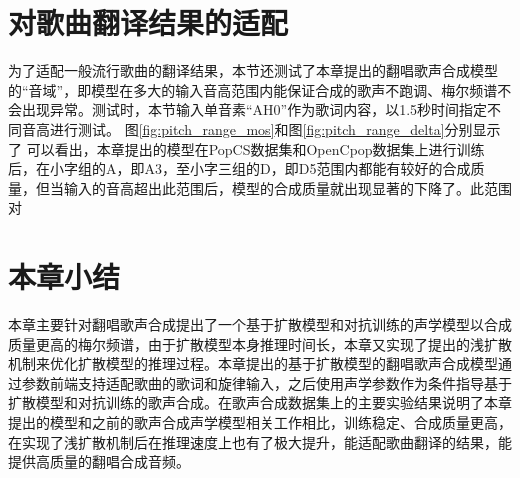 \section{对歌曲翻译结果的适配}
为了适配一般流行歌曲的翻译结果，本节还测试了本章提出的翻唱歌声合成模型的``音域''，即模型在多大的输入音高范围内能保证合成的歌声不跑调、梅尔频谱不会出现异常。测试时，本节输入单音素``AH0''作为歌词内容，以1.5秒时间指定不同音高进行测试。
图\ref{fig:pitch_range_mos}和图\ref{fig:pitch_range_delta}分别显示了
可以看出，本章提出的模型在PopCS数据集和OpenCpop数据集上进行训练后，在小字组的A，即A3，至小字三组的D，即D5范围内都能有较好的合成质量，但当输入的音高超出此范围后，模型的合成质量就出现显著的下降了。此范围对
\section{本章小结}
本章主要针对翻唱歌声合成提出了一个基于扩散模型和对抗训练的声学模型以合成质量更高的梅尔频谱，由于扩散模型本身推理时间长，本章又实现了\citet{diffsinger}提出的浅扩散机制来优化扩散模型的推理过程。本章提出的基于扩散模型的翻唱歌声合成模型通过参数前端支持适配歌曲的歌词和旋律输入，之后使用声学参数作为条件指导基于扩散模型和对抗训练的歌声合成。在歌声合成数据集上的主要实验结果说明了本章提出的模型和之前的歌声合成声学模型相关工作相比，训练稳定、合成质量更高，在实现了浅扩散机制后在推理速度上也有了极大提升，能适配歌曲翻译的结果，能提供高质量的翻唱合成音频。
